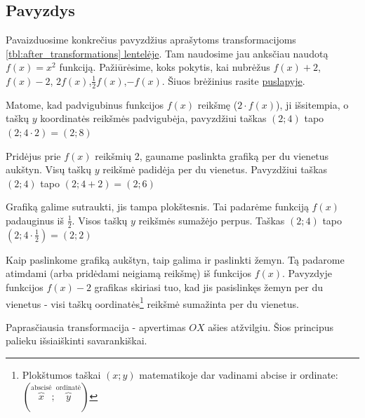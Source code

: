 \documentclass{tufte-handout}
\begin{document}
\subsection{Pavyzdys}\label{sec:function_transformation_example}

Pavaizduosime konkrečius pavyzdžius
aprašytoms transformacijoms
\hyperref[tbl:after_transformations]{\ref*{tbl:after_transformations}
  lentelėje}. Tam naudosime jau anksčiau naudotą $f(x)=x^2$ funkciją.
Pažiūrėsime, koks pokytis, kai nubrėžus $f(x)+2$,  $f(x)-2$,
$2f(x)$,$\frac{1}{2}f(x)$,$-f(x)$. Šiuos brėžinius rasite
\hyperref[sec:function_transformation_example]{\pageref*{fig:function_transformation_example}
  puslapyje}.

Matome, kad padvigubinus funkcijos $f(x)$ reikšmę ($2 \cdot f(x)$),
ji išsitempia, o taškų $y$ koordinatės reikšmės padvigubėja, pavyzdžiui taškas
$(2; 4)$ tapo $(2;4 \cdot 2)=(2;8)$

Pridėjus prie $f(x)$ reikšmių 2, gauname paslinkta grafiką per du vienetus
aukštyn. Visų taškų $y$ reikšmė padidėja per du vienetus. Pavyzdžiui taškas
$(2; 4)$ tapo $(2;4 + 2)=(2;6)$

Grafiką galime sutraukti, jis tampa plokštesnis. Tai padarėme funkciją $f(x)$
padauginus iš $\frac{1}{2}$. Visos taškų $y$ reikšmės sumažėjo perpus. Taškas
$(2; 4)$ tapo $(2;4 \cdot \frac{1}{2})=(2;2)$

Kaip paslinkome grafiką aukštyn, taip galima ir paslinkti žemyn. Tą padarome
atimdami (arba pridėdami neigiamą reikšmę) iš funkcijos $f(x)$. Pavyzdyje
funkcijos $f(x)-2$ grafikas skiriasi tuo, kad jis pasislinkęs žemyn per du
vienetus - visi taškų oordinatės\footnote{Plokštumos taškai $(x;y)$
matematikoje dar vadinami abcise ir ordinate: $
  (\overbrace{x}^{\text{abscisė}};
  \overbrace{y}^{\text{ordinatė}})$} reikšmė sumažinta per du
vienetus.

Paprasčiausia transformacija - apvertimas $OX$ ašies atžvilgiu.
Šios principus palieku išsiaiškinti savarankiškai.
\end{document}

